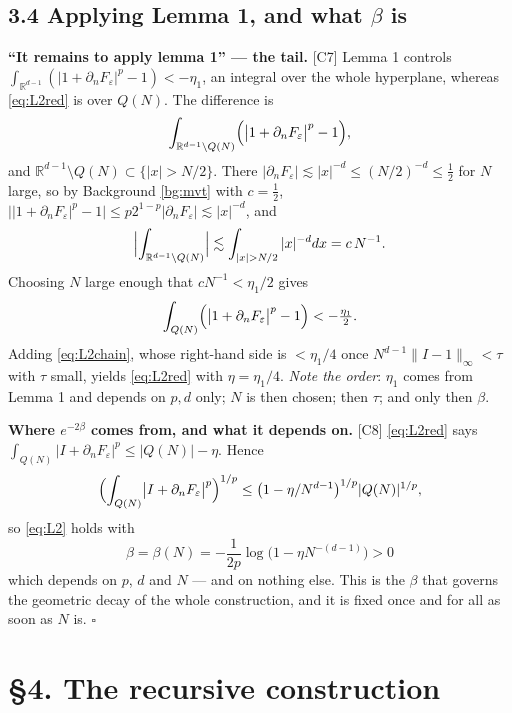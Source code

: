\documentclass[11pt,reqno]{amsart}
\theoremstyle{plain}
\theoremstyle{definition}
\theoremstyle{plain}
\theoremstyle{definition}
\theoremstyle{remark}
\newcommand{\Rdm}{\mathbb{R}^{d-1}}
\newcommand{\nd}{\partial_n}
\newcommand{\Ledger}[1]{{\scriptsize\textsf{[#1]}}}
\begin{document}
\subsection*{3.4 Applying Lemma 1, and what $\beta$ is}

\begin{filled}
\textbf{``It remains to apply lemma 1'' --- the tail.} \Ledger{C7} Lemma 1 controls
$\int_{\Rdm}(|1+\nd F_\varepsilon|^p-1)<-\eta_1$, an integral over the whole
hyperplane, whereas \eqref{eq:L2red} is over $Q(N)$. The difference is
\[\int_{\Rdm\setminus Q(N)}\Bigl(\bigl|1+\nd F_\varepsilon\bigr|^p-1\Bigr),\]
and $\Rdm\setminus Q(N)\subset\{|x|>N/2\}$. There
$|\nd F_\varepsilon|\lesssim|x|^{-d}\le(N/2)^{-d}\le\frac12$ for $N$ large, so by
Background \ref{bg:mvt} with $c=\frac12$,
$\bigl||1+\nd F_\varepsilon|^p-1\bigr|\le p2^{1-p}|\nd F_\varepsilon|
 \lesssim|x|^{-d}$, and
\[\Bigl|\int_{\Rdm\setminus Q(N)}\Bigr|\lesssim\int_{|x|>N/2}|x|^{-d}dx
 =c\,N^{-1}.\]
Choosing $N$ large enough that $cN^{-1}<\eta_1/2$ gives
\[\int_{Q(N)}\Bigl(\bigl|1+\nd F_\varepsilon\bigr|^p-1\Bigr)<-\tfrac{\eta_1}2 .\]
Adding \eqref{eq:L2chain}, whose right-hand side is $<\eta_1/4$ once
$N^{d-1}\|I-1\|_\infty<\tau$ with $\tau$ small, yields \eqref{eq:L2red} with
$\eta=\eta_1/4$. \emph{Note the order}: $\eta_1$ comes from Lemma 1 and depends on
$p,d$ only; $N$ is then chosen; then $\tau$; and only then $\beta$.
\end{filled}

\begin{expansion}
\textbf{Where $e^{-2\beta}$ comes from, and what it depends on.} \Ledger{C8}
\eqref{eq:L2red} says $\int_{Q(N)}|I+\nd F_\varepsilon|^p\le|Q(N)|-\eta$. Hence
\[\Bigl(\int_{Q(N)}\bigl|I+\nd F_\varepsilon\bigr|^p\Bigr)^{1/p}
 \le\bigl(1-\eta/N^{d-1}\bigr)^{1/p}|Q(N)|^{1/p},\]
so \eqref{eq:L2} holds with
\[\boxed{\ \beta=\beta(N)=-\frac1{2p}\log\bigl(1-\eta N^{-(d-1)}\bigr)>0\ }\]
which depends on $p$, $d$ and $N$ --- and on nothing else. This is the $\beta$ that
governs the geometric decay of the whole construction, and it is fixed once and
for all as soon as $N$ is. \hfill$\square$
\end{expansion}

\section*{\S4. The recursive construction}
\end{document}
